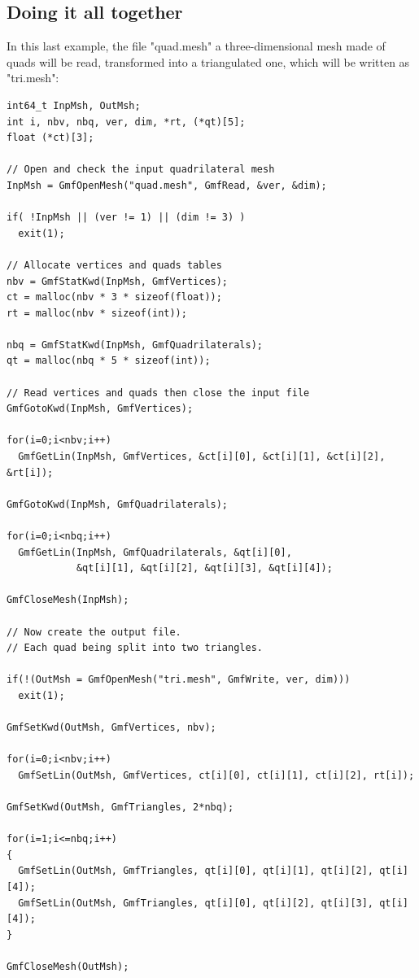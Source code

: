 \documentclass[a4paper,12pt]{article}
\begin{document}
\subsection{Doing it all together}

In this last example, the file "quad.mesh" a three-dimensional mesh made of quads will be read, transformed into a triangulated one, which will be written as "tri.mesh":

\begin{tt}
\begin{verbatim}
int64_t InpMsh, OutMsh;
int i, nbv, nbq, ver, dim, *rt, (*qt)[5];
float (*ct)[3];

// Open and check the input quadrilateral mesh
InpMsh = GmfOpenMesh("quad.mesh", GmfRead, &ver, &dim);

if( !InpMsh || (ver != 1) || (dim != 3) )
  exit(1);

// Allocate vertices and quads tables
nbv = GmfStatKwd(InpMsh, GmfVertices);
ct = malloc(nbv * 3 * sizeof(float));
rt = malloc(nbv * sizeof(int));

nbq = GmfStatKwd(InpMsh, GmfQuadrilaterals);
qt = malloc(nbq * 5 * sizeof(int));

// Read vertices and quads then close the input file
GmfGotoKwd(InpMsh, GmfVertices);

for(i=0;i<nbv;i++)
  GmfGetLin(InpMsh, GmfVertices, &ct[i][0], &ct[i][1], &ct[i][2], &rt[i]);

GmfGotoKwd(InpMsh, GmfQuadrilaterals);

for(i=0;i<nbq;i++)
  GmfGetLin(InpMsh, GmfQuadrilaterals, &qt[i][0],
            &qt[i][1], &qt[i][2], &qt[i][3], &qt[i][4]);

GmfCloseMesh(InpMsh);

// Now create the output file.
// Each quad being split into two triangles.

if(!(OutMsh = GmfOpenMesh("tri.mesh", GmfWrite, ver, dim)))
  exit(1);

GmfSetKwd(OutMsh, GmfVertices, nbv);

for(i=0;i<nbv;i++)
  GmfSetLin(OutMsh, GmfVertices, ct[i][0], ct[i][1], ct[i][2], rt[i]);

GmfSetKwd(OutMsh, GmfTriangles, 2*nbq);

for(i=1;i<=nbq;i++)
{
  GmfSetLin(OutMsh, GmfTriangles, qt[i][0], qt[i][1], qt[i][2], qt[i][4]);
  GmfSetLin(OutMsh, GmfTriangles, qt[i][0], qt[i][2], qt[i][3], qt[i][4]);
}

GmfCloseMesh(OutMsh);
\end{verbatim}
\end{tt}
\normalfont
\end{document}
